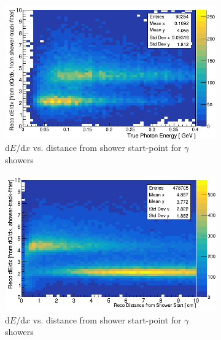 \documentclass[a4paper]{article}
\begin{document}
\begin{figure}[H] 
\begin{center}
    \begin{subfigure}[b]{0.45\textwidth}
    \centering
    \includegraphics[width=1.00\textwidth]{egamma/dedx_vs_energy_gamma.png}
    \caption{\label{fig:dedxgammas:energy} d$E$/d$x$ vs. distance from shower start-point for $\gamma$ showers}
    \end{subfigure}
    \begin{subfigure}[b]{0.45\textwidth}
    \centering
    \includegraphics[width=1.00\textwidth]{egamma/dedx_vs_dist_gamma.png}
    \caption{\label{fig:dedxgammas:dist} d$E$/d$x$ vs. distance from shower start-point for $\gamma$ showers}
    \end{subfigure}
\caption{\label{fig:dedxgammas}}
\end{center}
\end{figure}
\end{document}
